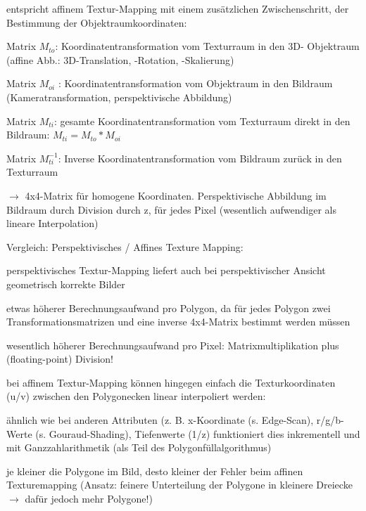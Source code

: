 \documentclass[landscape]{article}
\begin{document}
\begin{multicols}{3}
  
  entspricht affinem Textur-Mapping mit einem zusätzlichen Zwischenschritt, der Bestimmung der Objektraumkoordinaten:
  \begin{itemize*}
    \item Matrix $M_{to}$: Koordinatentransformation vom Texturraum in den 3D- Objektraum (affine Abb.: 3D-Translation, -Rotation, -Skalierung)
    \item Matrix $M_{oi}$ : Koordinatentransformation vom Objektraum in den Bildraum (Kameratransformation, perspektivische Abbildung)
    \item Matrix $M_{ti}$: gesamte Koordinatentransformation vom Texturraum direkt in den Bildraum: $M_{ti} = M_{to}*M_{oi}$
    \item Matrix $M_{ti}^{-1}$: Inverse Koordinatentransformation vom Bildraum zurück in den Texturraum
  \end{itemize*}
  
  $\rightarrow$ 4x4-Matrix für homogene Koordinaten. Perspektivische Abbildung im Bildraum durch Division durch z, für jedes Pixel (wesentlich aufwendiger als lineare Interpolation)
  
  Vergleich: Perspektivisches / Affines Texture Mapping:
  \begin{itemize*}
    \item perspektivisches Textur-Mapping liefert auch bei perspektivischer Ansicht geometrisch korrekte Bilder
    \item etwas höherer Berechnungsaufwand pro Polygon, da für jedes Polygon zwei Transformationsmatrizen und eine inverse 4x4-Matrix bestimmt werden müssen
    \item wesentlich höherer Berechnungsaufwand pro Pixel: Matrixmultiplikation plus (floating-point) Division!
    \item bei affinem Textur-Mapping können hingegen einfach die Texturkoordinaten (u/v) zwischen den Polygonecken linear interpoliert werden:
    \item ähnlich wie bei anderen Attributen (z. B. x-Koordinate (s. Edge-Scan), r/g/b-Werte (s. Gouraud-Shading), Tiefenwerte (1/z) funktioniert dies inkrementell und mit Ganzzahlarithmetik (als Teil des Polygonfüllalgorithmus)
    \item je kleiner die Polygone im Bild, desto kleiner der Fehler beim affinen Texturemapping (Ansatz: feinere Unterteilung der Polygone in kleinere Dreiecke $\rightarrow$ dafür jedoch mehr Polygone!)
  \end{itemize*}
  

\end{multicols}
\end{document}
